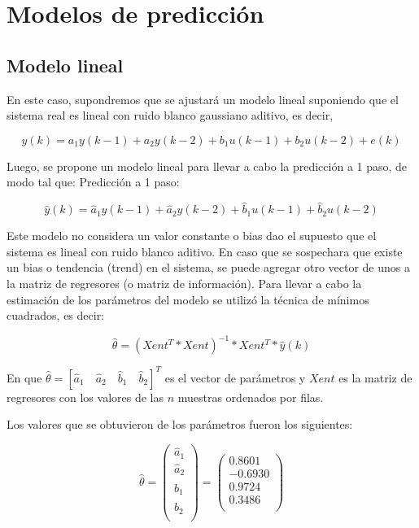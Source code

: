 \documentclass[12pt]{article}
\begin{document}
\clearpage
\newpage
\section{Modelos de predicción}
\subsection{Modelo lineal}

En este caso, supondremos que se ajustará un modelo lineal suponiendo que el sistema real es lineal con ruido blanco gaussiano aditivo, es decir,


\begin{equation}
y(k)=a_1 y(k-1)+a_2 y(k-2)+b_1 u(k-1)+b_2 u(k-2)+e(k)
\label{e_ModeloLineal}
\end{equation}

Luego, se propone un modelo lineal para llevar a cabo la predicción a 1 paso, de modo tal que:
Predicción a 1 paso:

\begin{equation}
\hat{y}(k)=\hat{a}_1 y(k-1)+\hat{a}_2 y(k-2)+\hat{b}_1 u(k-1)+\hat{b}_2 u(k-2)
\label{e_Pre1paso}
\end{equation}

Este modelo no considera un valor constante o bias dao el supuesto que el sistema es lineal con ruido blanco aditivo. En caso que se sospechara que existe un bias o tendencia (trend) en el sistema, se puede agregar otro vector de unos a la matriz de regresores (o matriz de información). Para llevar a cabo la estimación de los parámetros del modelo se utilizó la técnica de mínimos cuadrados, es decir:

\begin{equation}
\hat{\theta}=(Xent^T*Xent)^{-1}*Xent^T*\hat{y}(k)
\label{e_AjustMinCuadrados}
\end{equation}


En que $\hat{\theta}=[\hat{a}_1 \quad \hat{a}_2 \quad \hat{b}_1 \quad \hat{b}_2]^T$ es el vector de parámetros y $Xent$ es la matriz de regresores con los valores de las $n$ muestras ordenados por filas.

Los valores que se obtuvieron de los parámetros fueron los siguientes:


\begin{equation}
\hat{\theta}=\left(
                \begin{array}{c}
                  \hat{a}_1  \\
                  \hat{a}_2  \\
                  \hat{b}_1  \\
                  \hat{b}_2  \\
                \end{array}
              \right)
=\left(
   \begin{array}{c}
     0.8601 \\
     -0.6930 \\
     0.9724 \\
     0.3486 \\
   \end{array}
 \right)
\label{e_ValoresCoeficientes}
\end{equation}
\end{document}
